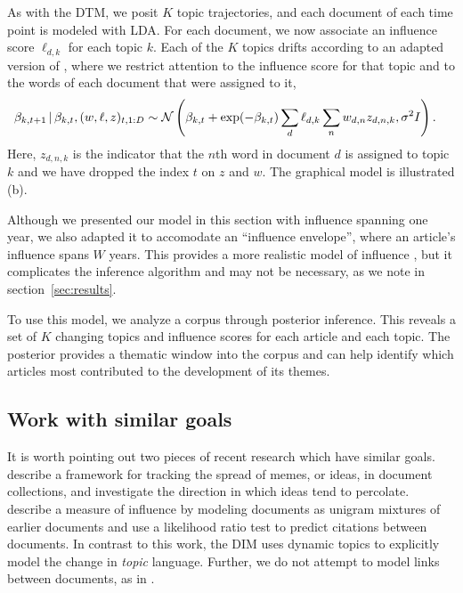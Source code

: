 As with the DTM, we posit $K$ topic trajectories, and each document of
each time point is modeled with LDA.  For each document, we now
associate an influence score $\ell_{d,k}$ for each topic $k$.  Each of
the $K$ topics drifts according to an adapted version of
, where we restrict attention to the influence
score for that topic and to the words of each document that were
assigned to it,
\begin{equation}
  \begin{split}
    \label{eq:logistic-normal-influence-topics}
    \beta_{k,t+1} & \, | \, \beta_{k,t}, (w, \ell, z)_{t,1:D} \sim
    \mathcal{N}\left(
      \beta_{k,t} +
      \exp(-\beta_{k,t}) \sum_{d} \ell_{d,k} \sum_n w_{d,n} z_{d,n,k},
      \sigma^2 I
    \right).
  \end{split}
\end{equation}
Here, $z_{d,n,k}$ is the indicator that the $n$th word in document $d$
is assigned to topic $k$ and we have dropped the index $t$ on $z$ and
$w$.  The graphical model is illustrated  (b).

Although we presented our model in this section with influence
spanning one year, we also adapted it to accomodate an ``influence
envelope'', where an article's influence spans $W$ years.  This
provides a more realistic model of influence \citep{porter:2005}, but
it complicates the inference algorithm and may not be necessary, as we
note in section~\ref{sec:results}.


To use this model, we analyze a corpus through posterior inference.
This reveals a set of $K$ changing topics and influence scores for
each article and each topic.  The posterior provides a thematic window
into the corpus and can help identify which articles most contributed
to the development of its themes.

\subsection*{Work with similar goals}

It is worth pointing out two pieces of recent research which have similar
goals. \cite{leskovec:2009} describe a framework for tracking the
spread of memes, or ideas, in document collections, and investigate
the direction in which ideas tend to percolate.
\cite{shaparenko:2007} describe a measure of influence by modeling
documents as unigram mixtures of earlier documents and use a
likelihood ratio test to predict citations between documents. In
contrast to this work, the DIM uses dynamic topics to explicitly model
the change in \emph{topic} language.  Further, we do not attempt to
model links between documents, as in \cite{shaparenko:2007}.  %
